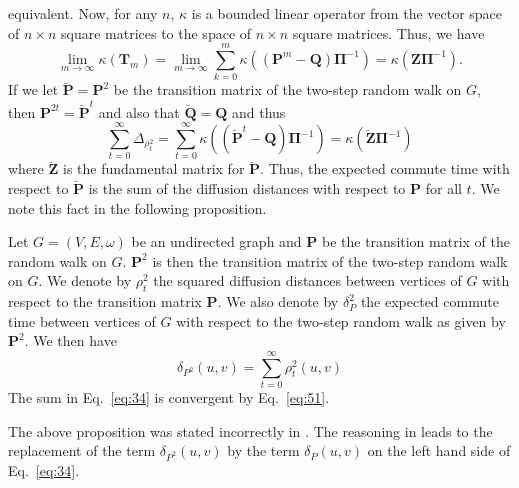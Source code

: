 equivalent. Now, for any $n$, $\kappa$ is a bounded linear operator
from the vector space of $n \times n$ square matrices to the space of
$n \times n$ square matrices. Thus, we have
\begin{equation}
  \label{eq:50}
  \lim_{m \rightarrow \infty}\kappa(\mathbf{T}_m) = \lim_{m \rightarrow \infty}
  \sum_{k=0}^{m}{\kappa((\mathbf{P}^{m} - \mathbf{Q})\bm{\Pi}^{-1})} =
    \kappa(\mathbf{Z}\bm{\Pi}^{-1}).
\end{equation}
If we let $\breve{\mathbf{P}} = \mathbf{P}^{2}$ be the transition matrix
of the two-step random walk on $G$, then $\mathbf{P}^{2t} =
\breve{\mathbf{P}}^{t}$ and also that $\breve{\mathbf{Q}} = \mathbf{Q}$ and thus
\begin{equation}
  \label{eq:51}
  \sum_{t = 0}^{\infty} \Delta_{\rho_{t}^{2}} = \sum_{t = 0}^{\infty}
  \kappa((\breve{\mathbf{P}}^{t} - \mathbf{Q})\bm{\Pi}^{-1}) =
  \kappa(\breve{\mathbf{Z}} \bm{\Pi}^{-1})
\end{equation}
where $\breve{\mathbf{Z}}$ is the fundamental matrix for
$\breve{\mathbf{P}}$. Thus, the expected commute time with respect to
$\breve{\mathbf{P}}$ is the
sum of the diffusion distances with respect to $\mathbf{P}$ for
all $t$. We note this fact in the following proposition.
\begin{proposition}
  \label{prop:17}
  Let $G = (V,E,\omega)$ be an undirected graph and $\mathbf{P}$ be
  the transition matrix of the random walk on $G$. $\mathbf{P}^{2}$ is
  then the transition matrix of the two-step random walk on $G$. We
  denote by $\rho_{t}^{2}$ the squared diffusion distances between
  vertices of $G$ with respect to the transition matrix
  $\mathbf{P}$. We also denote by $\delta_P^{2}$ the expected commute
  time between vertices of $G$ with respect to the two-step random
  walk as given by $\mathbf{P}^{2}$. We then have
  \begin{equation}
    \label{eq:34}
    \delta_{P^{2}}(u,v) = \sum_{t = 0}^{\infty}{\rho_{t}^{2}(u,v)}
  \end{equation}
  The sum in Eq.~\eqref{eq:34} is convergent by Eq.~\eqref{eq:51}.
\end{proposition}
The above proposition was stated incorrectly in 
\citep{qui07:_clust}. The reasoning in
\citep{qui07:_clust} leads to the replacement of the term
$\delta_{P^2}(u,v)$ by the term $\delta_{P}(u,v)$ on the left hand
side of Eq.~\eqref{eq:34}. 
%
%

